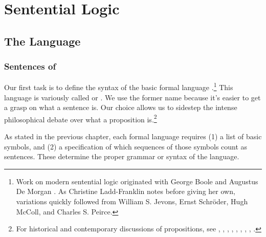 
\chapter{Sentential Logic}\label{sententiallogic}


\section{The Language \GSL{}}\label{The Language GSL}

\subsection{Sentences of \GSL{}}\label{Sentences of GSL}
Our first task is to define the syntax of the basic formal language \GSL{}.\footnote{Work on modern sentential logic originated with George Boole \citeyearpar{Boole1854} and Augustus De Morgan \citeyearpar{DeMorgan1847,DeMorgan1860}. 
	As Christine Ladd-Franklin notes \citeyearpar[17]{LaddFranklin1883} before giving her own, variations quickly followed from William S. Jevons, Ernst Schr\"oder, Hugh McColl, and Charles S. Peirce.} 
This language is variously called  or . 
We use the former name because it's easier to get a grasp on what a sentence is.
Our choice allows us to sidestep the intense philosophical debate over what a proposition is.\footnote{For historical and contemporary discussions of propositions, see \citealt{Frege1892}, \citealt[13,47]{Russell1903}, \citealt[26]{Church1956}, \citealt[ch.~1]{Quine1986}, \citealt[ch.~3]{Schiffer1987}, \citealt{Grandy1993}, \citealt{Bealer1998b}, \citealp{King2007}, \citealt{Soames2010}.}

As stated in the previous chapter, each formal language requires (1) a list of basic symbols, and (2) a specification of which sequences of those symbols count as sentences.
These determine the proper grammar or syntax of the language. 

